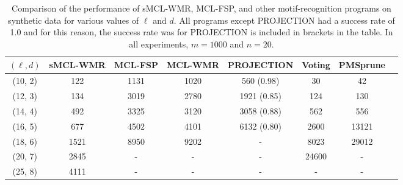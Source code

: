 \begin{table}[h!]
\begin{center} {
	\begin{tabular}{|c|c|c|c|c|c|c|c|}     
    \hline	
	$(\ell, d)$				& sMCL-WMR	 	& MCL-FSP	 	& MCL-WMR		& PROJECTION		& Voting		& PMSprune			\\
	\hline
    (10, 2)					& 122 					& 1131				& 1020 			& 560 (0.98)		& 30				& 42 					\\
	(12, 3)  				& 134 					& 3019				& 2780				& 1921 (0.85) 		& 124			& 130 					\\
	(14, 4)		 			& 492 					& 3325				& 3120				& 3058 (0.88)		& 562			& 556			 		\\
	(16, 5)					& 677 					& 4502				& 4101				& 6132 (0.80)		& 2600		  	& 13121					\\
	(18, 6)					& 1521 				& 8950				& 9202				& -						& 8023			& 29012  				\\
	(20, 7)					& 2845					& -					& -					& -						& 24600		& - 						\\
	(25, 8)				    & 4111 				& -					&	-					& -						&	-			 	& - 						\\
	\hline
	\end{tabular}}
\end{center}
\caption[Comparison of the performance of sMCL-WMR, MCL-FSP, and other motif-recognition programs on synthetic data for various values of $\ell$ and $d$.]{Comparison of the performance of sMCL-WMR, MCL-FSP, and other motif-recognition programs on synthetic data for various values of $\ell$ and $d$. All programs except PROJECTION had a success rate of 1.0 and for this reason, the success rate was for PROJECTION is included in brackets in the table. In all experiments, $m = 1000$ and $n = 20$.}
\label{smcl_wmr:compare1}
\end{table}


